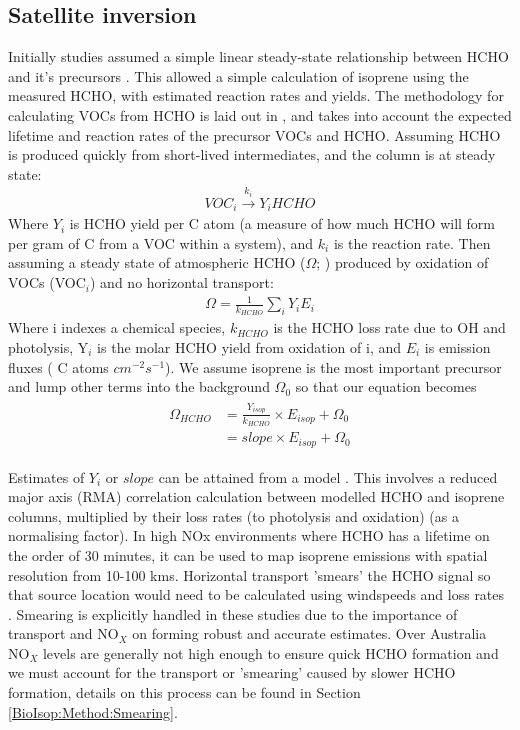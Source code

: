   \subsection{Satellite inversion}
  \label{BioIsop:SatInv}
  
    
    Initially studies assumed a simple linear steady-state relationship between HCHO and it's precursors \parencite{Palmer2003, Palmer2006, Millet2006}.
    This allowed a simple calculation of isoprene using the measured HCHO, with estimated reaction rates and yields.
    The methodology for calculating VOCs from HCHO is laid out in \textcite{Palmer2003}, and takes into account the expected lifetime and reaction rates of the precursor VOCs and HCHO.
    Assuming HCHO is produced quickly from short-lived intermediates, and the column is at steady state:
    \begin{eqnarray*}
      VOC_i \overset{k_i}{\rightarrow} Y_i HCHO
    \end{eqnarray*}
    Where $Y_i$ is HCHO yield per C atom (a measure of how much HCHO will form per gram of C from a VOC within a system), and $k_i$ is the reaction rate.
    Then assuming a steady state of atmospheric HCHO ($\Omega$; \moleccm) produced by oxidation of VOCs (VOC$_i$) and no horizontal transport:
    \begin{eqnarray*}
      \Omega = \frac{1}{k_{HCHO}} \sum_{i} Y_i E_i
    \end{eqnarray*}
    Where i indexes a chemical species, $k_{HCHO}$ is the HCHO loss rate due to OH and photolysis, Y$_i$ is the molar HCHO yield from oxidation of i, and $E_i$ is emission fluxes ( C atoms $cm^{-2}s^{-1}$).
    We assume isoprene is the most important precursor and lump other terms into the background $\Omega_0$ so that our equation becomes 
    \begin{eqnarray} \begin{split}
      \Omega_{HCHO} 
      &= \frac{Y_{isop}}{k_{HCHO}} \times E_{isop} + \Omega_0 \\
      & = slope \times E_{isop} + \Omega_0
    \end{split} \end{eqnarray}
    
    Estimates of $Y_i$ or $slope$ can be attained from a model \parencite[e.g.][]{Millet2006}.
    This involves a reduced major axis (RMA) correlation calculation between modelled HCHO and isoprene columns, multiplied by their loss rates (to photolysis and oxidation) (as a normalising factor).  
    In high NOx environments where HCHO has a lifetime on the order of 30 minutes, it can be used to map isoprene emissions with spatial resolution from 10-100 kms.
    Horizontal transport 'smears' the HCHO signal so that source location would need to be calculated using windspeeds and loss rates \parencite{Palmer2001,Palmer2003}.
    Smearing is explicitly handled in these studies due to the importance of transport and NO$_X$ on forming robust and accurate estimates.
    Over Australia NO$_X$ levels are generally not high enough to ensure quick HCHO formation and we must account for the transport or 'smearing' caused by slower HCHO formation, details on this process can be found in Section \ref{BioIsop:Method:Smearing}.
    
